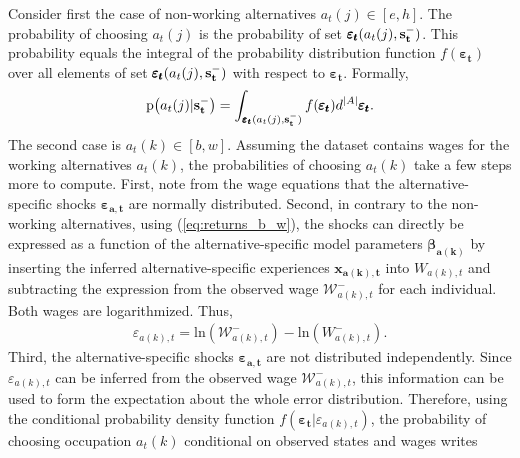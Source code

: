 Consider first the case of non-working alternatives $a_t(j) \in [e,h]$. The probability of choosing $a_t(j)$ is the probability of set $\pmb{\varepsilon_t}(a_t(j),\bold{s_t^-})$. This probability equals the integral of the probability distribution function $f(\pmb{\varepsilon_t})$ over all elements of set $\pmb{\varepsilon_t}(a_t(j),\bold{s_t^-})$ with respect to $\pmb{\varepsilon_t}$. Formally,
\begin{align}
\text{p}\big(a_t(j) | \bold{s_t^-}\big) = \int_{\pmb{\varepsilon_t}(a_t(j),\bold{s_t^-})} f(\pmb{\varepsilon_t}) d^{|A|} \pmb{\varepsilon_t}.
\end{align}
\noindent
The second case is $a_t(k) \in [b,w]$. Assuming the dataset contains wages for the working alternatives $a_t(k)$, the probabilities of choosing $a_t(k)$ take a few steps more to compute. First, note from the wage equations that the alternative-specific shocks $\pmb{\varepsilon_{a,t}}$ are normally distributed. Second, in contrary to the non-working alternatives, using (\ref{eq:returns_b_w}), the shocks can directly be expressed as a function of the alternative-specific model parameters $\pmb{\beta_{a(k)}}$ by inserting the inferred alternative-specific experiences $\pmb{x_{a(k),t}}$ into $W_{a(k),t}$ and subtracting the expression from the observed wage $\mathcal{W}^{-}_{a(k),t}$ for each individual. Both wages are logarithmized. Thus,
\begin{align} \label{eq:epsilon}
\varepsilon_{a(k),t} = \text{ln}(\mathcal{W}^{-}_{a(k),t}) - \text{ln}(W_{a(k),t}^{-}).
\end{align}
Third, the alternative-specific shocks $\pmb{\varepsilon_{a,t}}$ are not distributed independently. Since $\varepsilon_{a(k),t}$ can be inferred from the
observed wage $\mathcal{W}^{-}_{a(k),t}$, this information can be used to form the expectation about the whole error distribution. Therefore, using the conditional probability density function $f(\pmb{\varepsilon_t}|\varepsilon_{a(k),t})$, the probability of choosing occupation $a_t(k)$ conditional on observed states and wages writes

